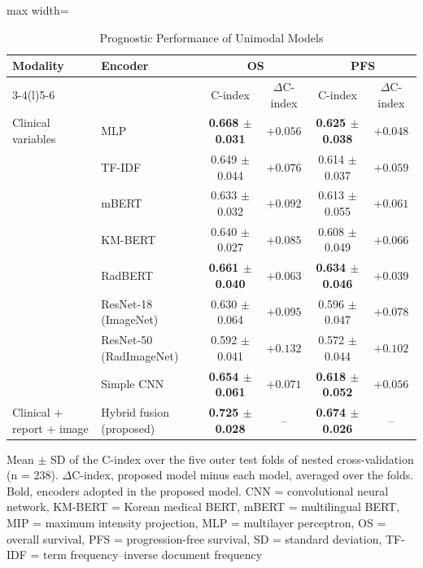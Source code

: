 \documentclass{article}
\begin{document}
\begin{table}[htbp]
\centering
\setlength{\belowcaptionskip}{4pt}
\caption{Prognostic Performance of Unimodal Models}
\label{tab:unimodal}
\small\setlength{\tabcolsep}{4pt}
\begin{adjustbox}{max width=\textwidth}
\begin{tabular}{@{}ll cc cc@{}}
\toprule
Modality & Encoder & \multicolumn{2}{c}{OS} & \multicolumn{2}{c}{PFS} \\
\cmidrule(lr){3-4}\cmidrule(l){5-6}
 & & C-index & $\Delta$C-index & C-index & $\Delta$C-index \\
\midrule
Clinical variables & MLP & \textbf{0.668 $\pm$ 0.031} & $+0.056$ & \textbf{0.625 $\pm$ 0.038} & $+0.048$ \\
\addlinespace
\multirow{4}{*}{Radiology report} & TF-IDF & 0.649 $\pm$ 0.044 & $+0.076$ & 0.614 $\pm$ 0.037 & $+0.059$ \\
 & mBERT & 0.633 $\pm$ 0.032 & $+0.092$ & 0.613 $\pm$ 0.055 & $+0.061$ \\
 & KM-BERT & 0.640 $\pm$ 0.027 & $+0.085$ & 0.608 $\pm$ 0.049 & $+0.066$ \\
 & RadBERT & \textbf{0.661 $\pm$ 0.040} & $+0.063$ & \textbf{0.634 $\pm$ 0.046} & $+0.039$ \\
\addlinespace
\multirow{3}{*}{PET-CT MIP} & ResNet-18 (ImageNet) & 0.630 $\pm$ 0.064 & $+0.095$ & 0.596 $\pm$ 0.047 & $+0.078$ \\
 & ResNet-50 (RadImageNet) & 0.592 $\pm$ 0.041 & $+0.132$ & 0.572 $\pm$ 0.044 & $+0.102$ \\
 & Simple CNN & \textbf{0.654 $\pm$ 0.061} & $+0.071$ & \textbf{0.618 $\pm$ 0.052} & $+0.056$ \\
\midrule
Clinical + report + image & Hybrid fusion (proposed) & \textbf{0.725 $\pm$ 0.028} & -- & \textbf{0.674 $\pm$ 0.026} & -- \\
\bottomrule
\end{tabular}%
\end{adjustbox}
\par\smallskip
\begin{minipage}{\textwidth}\footnotesize
Mean $\pm$ SD of the C-index over the five outer test folds of nested cross-validation (n = 238). $\Delta$C-index, proposed model minus each model, averaged over the folds. Bold, encoders adopted in the proposed model. CNN = convolutional neural network, KM-BERT = Korean medical BERT, mBERT = multilingual BERT, MIP = maximum intensity projection, MLP = multilayer perceptron, OS = overall survival, PFS = progression-free survival, SD = standard deviation, TF-IDF = term frequency--inverse document frequency
\end{minipage}
\end{table}
\end{document}
